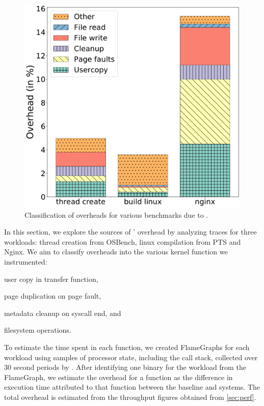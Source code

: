 \documentclass[letterpaper,twocolumn,10pt]{article}
\begin{document}
\begin{figure}
  \centering
  \includegraphics[width=\linewidth]{img/overhead.pdf}
  \caption{Classification of overheads for various benchmarks due to \midas.}
  \label{fig:overhead_class}
\end{figure}

In this section, we explore the sources of \midas' overhead by analyzing 
 traces for three workloads: thread creation from OSBench, linux 
compilation from PTS and Nginx. 
We aim to classify overheads into the various kernel function we instrumented:
\begin{inparaenum}
\item user copy in transfer function,
\item page duplication on page fault,
\item metadata cleanup on syscall end, and
\item filesystem operations.
\end{inparaenum}

To estimate the time spent in each function, we created FlameGraphs for 
each workload\cite{GreggFlameGraph} using samples of processor state, including
the call stack, collected over 30 second periods by .
After identifying one binary for the workload from the FlameGraph, we estimate 
the overhead for a function as the difference in execution time attributed to 
that function between the baseline and \midas systems.
The total overhead is estimated from the throughput figures obtained from 
\autoref{sec:perf}.
\end{document}
